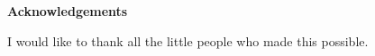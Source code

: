 \begin{center}\textbf{Acknowledgements}\end{center}

I would like to thank all the little people who made this possible.

\cleardoublepage
